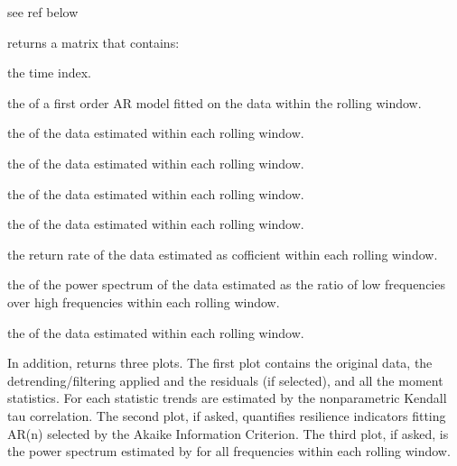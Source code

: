 \documentclass[a4paper]{book}
\begin{document}
%
\begin{Details}\relax
see ref below
\end{Details}
%
\begin{Value}
 returns a matrix that contains:

\begin{ldescription}
\item[\code{tim}] the time index.

\item[\code{ar1}] the  of
a first order AR model fitted on the data within the
rolling window.

\item[\code{sd}] the  of the data
estimated within each rolling window.

\item[\code{sk}] the  of the data estimated
within each rolling window.

\item[\code{kurt}] the  of the data estimated
within each rolling window.

\item[\code{cv}] the  of the data
estimated within each rolling window.

\item[\code{returnrate}] the return rate of the data estimated
as  cofficient within each rolling window.

\item[\code{densratio}] the  of the power
spectrum of the data estimated as the ratio of low
frequencies over high frequencies within each rolling
window.

\item[\code{acf1}] the  of
the data estimated within each rolling window.

\end{ldescription}
In addition,  returns three plots. The
first plot contains the original data, the
detrending/filtering applied and the residuals (if
selected), and all the moment statistics. For each
statistic trends are estimated by the nonparametric
Kendall tau correlation.  The second plot, if asked,
quantifies resilience indicators fitting AR(n) selected
by the Akaike Information Criterion. The third plot, if
asked, is the power spectrum estimated by
 for all frequencies within each
rolling window.
\end{Value}
\end{document}
